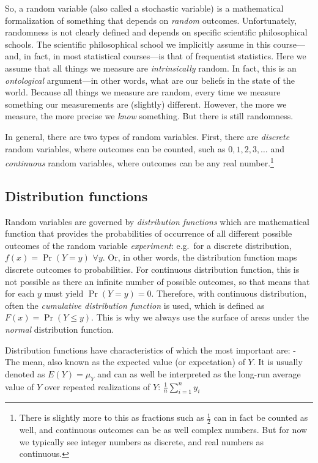 \documentclass[
]{book}
\begin{document}
So, a random variable (also called a stochastic variable) is a mathematical formalization of something that depends on \emph{random} outcomes. Unfortunately, randomness is not clearly defined and depends on specific scientific philosophical schools. The scientific philosophical school we implicitly assume in this course---and, in fact, in most statistical courses---is that of frequentist statistics. Here we assume that all things we measure are \emph{intrinsically} random. In fact, this is an \emph{ontological} argument---in other words, what are our beliefs in the state of the world. Because all things we measure are random, every time we measure something our measurements are (slightly) different. However, the more we measure, the more precise we \emph{know} something. But there is still randomness.

In general, there are two types of random variables. First, there are \emph{discrete} random variables, where outcomes can be counted, such as \(0, 1, 2, 3, \ldots\) and \emph{continuous} random variables, where outcomes can be any real number.\footnote{There is slightly more to this as fractions such as \(\frac{1}{2}\) can in fact be counted as well, and continuous outcomes can be as well complex numbers. But for now we typically see integer numbers as discrete, and real numbers as continuous.}

\hypertarget{distribution-functions}{%
\subsection{Distribution functions}\label{distribution-functions}}

Random variables are governed by \emph{distribution functions} which are mathematical function that
provides the probabilities of occurrence of all different possible outcomes of the random variable \emph{experiment}: e.g.~for a discrete distribution, \(f(x) = \Pr(Y = y)\) \(\forall y\). Or, in other words, the distribution function maps discrete outcomes to probabilities. For continuous distribution function, this is not possible as there an infinite number of possible outcomes, so that means that for each \(y\) must yield \(\Pr(Y = y) = 0\). Therefore, with continuous distribution, often the \emph{cumulative distribution function} is used, which is defined as \(F(x) = \Pr(Y \leq y)\). This is why we always use the surface of areas under the \emph{normal} distribution function.

Distribution functions have characteristics of which the most important are:
- The mean, also known as the expected value (or expectation) of \(Y\). It is usually denoted as \(E(Y) = \mu_Y\) and can as well be interpreted as the long-run average value of \(Y\) over repeated realizations of \(Y\): \(\frac{1}{n}\sum_{i = 1}^{n}y_{i}\)
\end{document}
